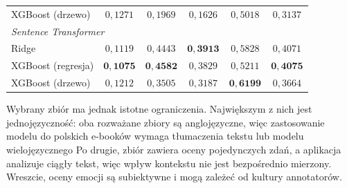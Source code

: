 \begin{table}[htbp]
\begin{tabular}{l c c c c c}
        \hspace{2em}XGBoost (drzewo)   & $0{,}1271$ & $0{,}1969$ & $0{,}1626$ & $0{,}5018$ & $0{,}3137$ \\
        \multicolumn{6}{l}{\hspace{1em}\textit{Sentence Transformer}} \\
        \hspace{2em}Ridge              & $0{,}1119$ & $0{,}4443$ & $\mathbf{0{,}3913}$ & $0{,}5828$ & $0{,}4071$ \\
        \hspace{2em}XGBoost (regresja) & $\mathbf{0{,}1075}$ & $\mathbf{0{,}4582}$ & $0{,}3829$ & $0{,}5211$ & $\mathbf{0{,}4075}$ \\
        \hspace{2em}XGBoost (drzewo)   & $0{,}1212$ & $0{,}3505$ & $0{,}3187$ & $\mathbf{0{,}6199}$ & $0{,}3664$ \\
        \bottomrule
    \end{tabular}
    \label{tab:lexicon_vs_st}
\end{table}

\FloatBarrier
Wybrany zbiór ma jednak istotne ograniczenia. Największym z nich jest
jednojęzyczność: oba rozważane zbiory są anglojęzyczne, więc zastosowanie
modelu do polskich e-booków wymaga tłumaczenia tekstu lub modelu
wielojęzycznego Po drugie, zbiór zawiera oceny pojedynczych zdań, a aplikacja analizuje ciągły
tekst, więc wpływ kontekstu nie jest bezpośrednio mierzony. Wreszcie, oceny
emocji są subiektywne i mogą zależeć od kultury annotatorów.
